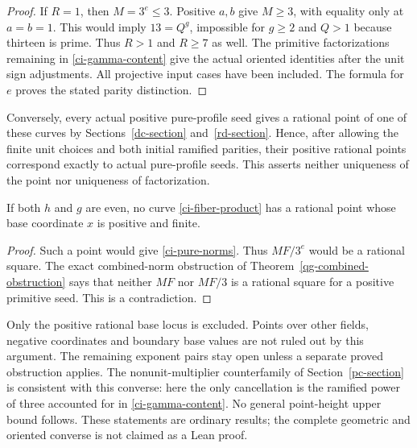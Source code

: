 \begin{proof}
If $R=1$, then $M=3^e\le3$. Positive $a,b$ give $M\ge3$,
with equality only at $a=b=1$. This would imply $13=Q^g$,
impossible for $g\ge2$ and $Q>1$ because thirteen is prime.
Thus $R>1$ and $R\ge7$ as well. The primitive factorizations
remaining in \eqref{ci-gamma-content} give the actual oriented
identities after the unit sign adjustments. All projective input
cases have been included. The formula for $e$ proves the stated
parity distinction.
\end{proof}

Conversely, every actual positive pure-profile seed gives a
rational point of one of these curves by Sections~\ref{dc-section}
and~\ref{rd-section}. Hence, after allowing the finite unit choices
and both initial ramified parities, their positive rational points
correspond exactly to actual pure-profile seeds. This asserts
neither uniqueness of the point nor uniqueness of factorization.

\begin{corollary}
\label{ci-even-even}
If both $h$ and $g$ are even, no curve \eqref{ci-fiber-product}
has a rational point whose base coordinate $x$ is positive and finite.
\end{corollary}
\begin{proof}
Such a point would give \eqref{ci-pure-norms}. Thus $MF/3^e$
would be a rational square. The exact combined-norm obstruction
of Theorem~\ref{qg-combined-obstruction} says that neither $MF$
nor $MF/3$ is a rational square for a positive primitive seed.
This is a contradiction.
\end{proof}

Only the positive rational base locus is excluded. Points over other
fields, negative coordinates and boundary base values are not ruled
out by this argument. The remaining exponent pairs stay open unless
a separate proved obstruction applies. The nonunit-multiplier
counterfamily of Section~\ref{pc-section} is consistent with this
converse: here the only cancellation is the ramified power of three
accounted for in \eqref{ci-gamma-content}. No general point-height
upper bound follows. These statements are ordinary results; the
complete geometric and oriented converse is not claimed as a Lean proof.

